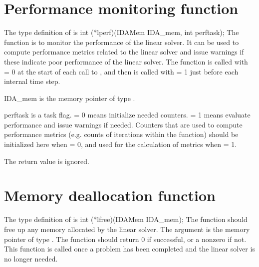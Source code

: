 
\section{Performance monitoring function}
The type definition of  is
{
  int (*lperf)(IDAMem IDA\_mem, int perftask);
}
{
  The  function is to monitor the performance of the linear solver.
  It can be used to compute performance metrics related to the linear solver
  and issue warnings if these indicate poor performance of the linear solver.
  The  function is called with  = 0 at the start of
  each call to , and then is called with  = 1 just
  before each internal time step.
}
{
  \begin{args}
  \item[IDA\_mem]
    is the {\idas} memory pointer of type .
  \item[perftask]
    is a task flag.   = 0 means initialize needed counters.
     = 1 means evaluate performance and issue warnings if needed.
    Counters that are used to compute performance metrics (e.g. counts of
    iterations within the  function) should be initialized here when
     = 0, and used for the calculation of metrics when
     = 1.
  \end{args}
}
{
  The  return value is ignored.
}
{}


\section{Memory deallocation function}
The type definition of  is
{
  int (*lfree)(IDAMem IDA\_mem);
}
{
  The  function should free up any memory allocated by the linear
  solver.
}
{
  The argument  is the {\idas} memory pointer of type .
}
{
  The  function should return 0 if successful, or a nonzero
  if not.
}
{
  This function is called once a problem has been completed and the 
  linear solver is no longer needed.
}
